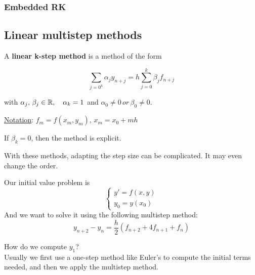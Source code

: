 \subsubsection{Embedded RK}

\newpage
\subsection{Linear multistep methods}

\begin{definition}
  A \textbf{linear k-step method} is a method of the form
  
  \[
    \sum_{j=0^k}\alpha_jy_{n+j} = h\sum_{j=0}^k\beta_jf_{n+j}
  \]
  
  with $\alpha_j,\,\beta_j\in\mathbb{R}, \quad \alpha_k = 1$ and $\alpha_0 \not=0 \, or \, \beta_0\not= 0$. \\
\end{definition}

\underline{Notation}: $f_m = f(x_m, y_m), \, x_m = x_0 + mh$

\begin{remark}
  If $\beta_k = 0$, then the method is explicit.
\end{remark}

\begin{remark}
  With these methods, adapting the step size can be complicated. It may even change the order.
\end{remark}

\begin{example}
    Our initial value problem is
    \[
      \begin{cases}
        y' = f(x,y) \\
        y_0 = y(x_0)
      \end{cases}
    \]
    And we want to solve it using the following multistep method:
    \[
      y_{n+2} - y_n = \frac{h}{2}(f_{n+2} + 4f_{n+1} + f_n)
    \]
    
    How do we compute $y_1$? \\
    
    Usually we first use a one-step method like Euler's to compute the initial terms needed, and then we apply the multistep method.
\end{example}

